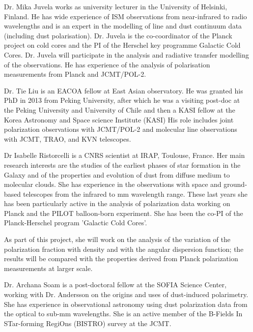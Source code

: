 \documentclass[11pt]{amsart}
\begin{document}
\newpage

Dr. Mika Juvela works as university lecturer in the University of Helsinki, Finland. He has wide experience of ISM observations from near-infrared to radio wavelengths and is an expert in the modelling of line and dust continuum data (including dust polarisation). Dr. Juvela is the co-coordinator of the Planck project on cold cores and the PI of the Herschel key programme Galactic Cold Cores. Dr. Juvela will participate in the analysis and radiative transfer modelling of the observations. He has experience of the analysis of polarisation measurements from Planck and JCMT/POL-2.

\vspace{5mm}
Dr. Tie Liu is an EACOA fellow at East Asian observatory. He was granted his PhD in 2013 from Peking University, after which he
was a visiting post-doc at the Peking University and University of Chile and then a KASI fellow 
at the Korea Astronomy and Space science Institute (KASI)
His role includes joint polarization observations with JCMT/POL-2 and molecular line observations with JCMT, TRAO, and  KVN telescopes.

\vspace{5mm}
Dr Isabelle Ristorcelli is a CNRS scientist at IRAP, Toulouse, France. Her main research interests are the studies of the earliest phases of star formation 
in the Galaxy and of the properties and evolution of dust from diffuse medium to molecular clouds. She has experience in the observations with 
space and ground-based telescopes from the infrared to mm wavelength range. These last years she has been particularly active in the analysis 
of polarization data working on Planck and the PILOT balloon-born experiment. She has been the co-PI of the Planck-Herschel program 'Galactic Cold Cores'.

As part of this project, she will work on the analysis of the variation of the polarization fraction with density and with the angular dispersion function; 
the results will be compared with the properties derived from Planck polarization measurements at larger scale.

\vspace{5mm}

Dr. Archana Soam is a post-doctoral fellow at the SOFIA Science Center, working with Dr. Andersson on the origins and uses of dust-induced polarimetry. She has experience in observational astronomy using dust polarization data from the optical to sub-mm wavelengths. She is an active member of the B-Fields In STar-forming RegiOns (BISTRO) survey at the JCMT. 
\end{document}
